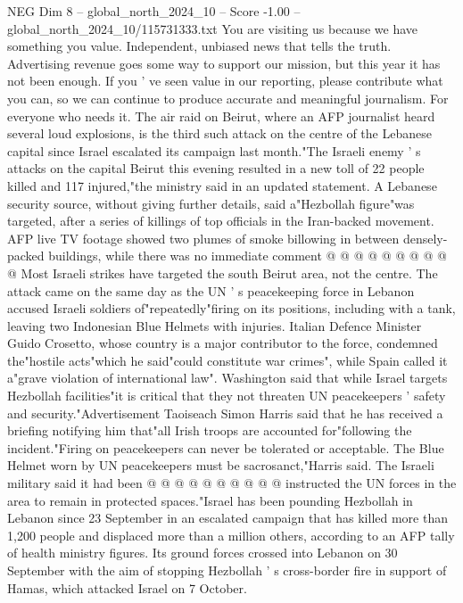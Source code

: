 \begin{textsample}{NEG Dim 8 – global\_north\_2024\_10 – Score -1.00 – global\_north\_2024\_10/115731333.txt}  \label{ex:f8_neg_296}
You are visiting us because we have something you value.
Independent, unbiased news that tells the truth.
Advertising revenue goes some way to support our mission, but this year it has not been enough.
If you ' ve seen value in our reporting, please contribute what you can, so we can continue to produce accurate and meaningful journalism.
For everyone who needs it.
The air raid on Beirut, where an AFP journalist heard several loud explosions, is the third such attack on the centre of the Lebanese capital since Israel escalated its campaign last month."The Israeli enemy ' s attacks on the capital Beirut this evening resulted in a new toll of 22 people killed and 117 injured,"the ministry said in an updated statement.
A Lebanese security source, without giving further details, said a"Hezbollah figure"was targeted, after a series of killings of top officials in the Iran-backed movement.
AFP live TV footage showed two plumes of smoke billowing in between densely-packed buildings, while there was no immediate comment @ @ @ @ @ @ @ @ @ @ Most Israeli strikes have targeted the south Beirut area, not the centre.
The attack came on the same day as the UN ' s peacekeeping force in Lebanon accused Israeli soldiers of"repeatedly"firing on its positions, including with a tank, leaving two Indonesian Blue Helmets with injuries.
Italian Defence Minister Guido Crosetto, whose country is a major contributor to the force, condemned the"hostile acts"which he said"could constitute war crimes", while Spain called it a"grave violation of international law".
Washington said that while Israel targets Hezbollah facilities"it is critical that they not threaten UN peacekeepers ' safety and security."Advertisement Taoiseach Simon Harris said that he has received a briefing notifying him that"all Irish troops are accounted for"following the incident."Firing on peacekeepers can never be tolerated or acceptable.
The Blue Helmet worn by UN peacekeepers must be sacrosanct,"Harris said.
The Israeli military said it had been @ @ @ @ @ @ @ @ @ @ instructed the UN forces in the area to remain in protected spaces."Israel has been pounding Hezbollah in Lebanon since 23 September in an escalated campaign that has killed more than 1,200 people and displaced more than a million others, according to an AFP tally of health ministry figures.
Its ground forces crossed into Lebanon on 30 September with the aim of stopping Hezbollah ' s cross-border fire in support of Hamas, which attacked Israel on 7 October.

\end{textsample}
